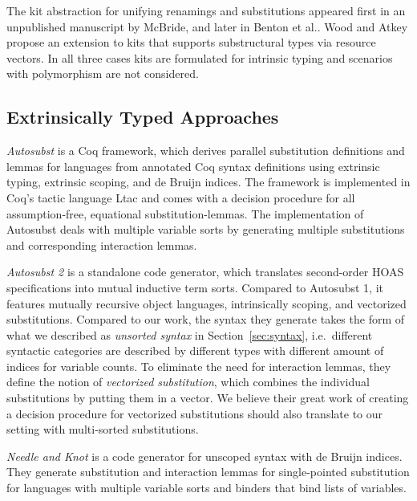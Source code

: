 \documentclass[a4paper, UKenglish, cleveref, autoref, thm-restate]{lipics-v2021}
\begin{document}
  The kit abstraction for unifying renamings and substitutions
  appeared first in an unpublished manuscript by
  McBride\cite{unpublished:mcbride2005kits}, and later in
  Benton et al.\cite{DBLP:journals/jar/BentonHKM12}. 
  Wood and Atkey\cite{DBLP:journals/corr/abs-2005-02247} propose an
  extension to kits that supports substructural types via resource
  vectors.
  In all three cases kits are formulated for intrinsic typing
  and scenarios with polymorphism are not considered.

  \subsection{Extrinsically Typed Approaches}

  \emph{Autosubst}\cite{DBLP:conf/itp/SchaferTS15}
  is a Coq framework, which derives parallel substitution definitions and
  lemmas for languages from annotated Coq syntax definitions using
  extrinsic typing, extrinsic scoping, and de Bruijn indices.
  The framework is implemented in Coq's tactic language Ltac and comes
  with a decision procedure for all assumption-free, equational
  substitution-lemmas.
  The implementation of Autosubst deals with multiple variable sorts
  by generating multiple substitutions and corresponding interaction lemmas.

  \emph{Autosubst 2}\cite{DBLP:conf/cpp/StarkSK19} is a standalone
  code generator, which translates second-order HOAS specifications into
  mutual inductive term sorts. Compared to Autosubst 1, it features
  mutually recursive object languages, intrinsically scoping, and
  vectorized substitutions.
  Compared to our work, the syntax they generate takes the form of
  what we described as \emph{unsorted syntax} in
  Section~\ref{sec:syntax}, i.e.\ different syntactic categories are
  described by different types with different amount of indices for
  variable counts. To eliminate the need for interaction lemmas, they
  define the notion of \emph{vectorized substitution}, which combines
  the individual substitutions by putting them in a vector.
  We believe their great work of creating a decision procedure for
  vectorized substitutions should also translate to our setting with
  multi-sorted substitutions.

  \emph{Needle and Knot}\cite{DBLP:conf/esop/KeuchelWS16} is a code
  generator for unscoped syntax with de Bruijn indices. They generate
  substitution and interaction lemmas for single-pointed substitution
  for languages with multiple variable sorts and binders that bind
  lists of variables.
  
\end{document}
